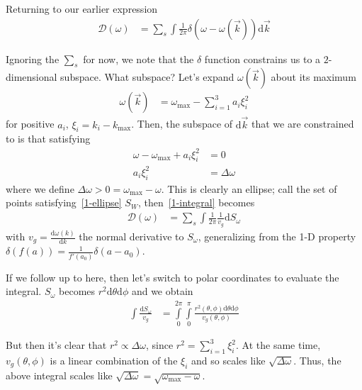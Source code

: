 \documentclass[10pt]{article}
\newcommand{\rd}[2]{\frac{\mathrm{d}#1}{\mathrm{d}#2}}
\begin{document}
\begin{enumerate}[(a)]
        Returning to our earlier expression
        \begin{align}
            \mathcal{D}(\omega) &= \sum_s
                \int \frac{1}{2\pi}\delta(\omega - \omega(\vec{k}))
                \mathrm{d}\vec{k}\label{1-integral}
        \end{align}

        Ignoring the $\sum_s$ for now, we note that the $\delta$ function
        constrains us to a $2$-dimensional subspace. What subspace? Let's expand
        $\omega(\vec{k})$ about its maximum
        \begin{align}
            \omega(\vec{k}) &= \omega_{\max} - \sum_{i=1}^3 a_i\xi_i^2
        \end{align}
        for positive $a_i$, $\xi_i = k_i - k_{\max}$. Then, the subspace of
        $\mathrm{d}\vec{k}$ that we are constrained to is that satisfying
        \begin{align}
            \omega - \omega_{\max} + a_i\xi_i^2 &= 0\\
            a_i\xi_i^2 &= \Delta \omega\label{1-ellipse}
        \end{align}
        where we define $\Delta \omega > 0 = \omega_{\max} - \omega$. This is
        clearly an ellipse; call the set of points satisfying~\eqref{1-ellipse}
        $S_W$, then~\eqref{1-integral} becomes
        \begin{align}
            \mathcal{D}(\omega) &= \sum_s
                \int \frac{1}{2\pi}\frac{1}{v_g}\mathrm{d}S_\omega
        \end{align}
        with $v_g = \rd{\omega(k)}{k}$ the normal derivative to $S_\omega$,
        generalizing from the 1-D property
        $\delta(f(a)) = \frac{1}{f'(a_0)}\delta(a - a_0)$.

        If we follow up to here, then let's switch to polar coordinates to
        evaluate the integral. $S_\omega$ becomes
        $r^2 \mathrm{d}\theta\mathrm{d}\phi$ and we obtain
        \begin{align}
            \int \frac{\mathrm{d}S_\omega}{v_g} &=
                \int\limits_{0}^{2\pi}\int\limits_{0}^{\pi}
                    \frac{r^2(\theta,\phi)\mathrm{d}\theta\mathrm{d}\phi}
                        {v_g(\theta,\phi)}
        \end{align}

        But then it's clear that $r^2 \propto \Delta \omega$, since
        $r^2 = \sum\limits_{i=1}^{3}\xi_i^2$. At the same time,
        $v_g(\theta,\phi)$ is a linear combination of the $\xi_i$ and so scales
        like $\sqrt{\Delta \omega}$. Thus, the above integral scales like
        $\sqrt{\Delta \omega} = \sqrt{\omega_{\max} - \omega}$.


\end{enumerate}
\end{document}
